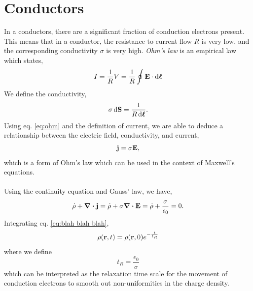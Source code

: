 \documentclass{book}
\begin{document}
\section{Conductors}
In a conductors, there are a significant fraction of conduction electrons present. This means that in a conductor, the resistance to current flow $R$ is very low, and the corresponding conductivity $\sigma$ is very high. \textit{Ohm's law} is an empirical law which states,
\begin{equation}
	I = \frac{1}{R}V = \frac{1}{R}\oint\vb{E}\cdot\dd{\vb*{\ell}} \label{eq:ohm}
\end{equation}
We define the conductivity,
\begin{equation}
	\sigma \dd{\vb{S}} = \frac{1}{R\dd{\vb*{\ell}}}.
\end{equation}
Using eq. \eqref{eq:ohm} and the definition of current, we are able to deduce a relationship between the electric field, conductivity, and current,
\begin{equation}
	\vb{j} = \sigma \vb{E},
\end{equation}
which is a form of Ohm's law which can be used in the context of Maxwell's equations.
\\\\
Using the continuity equation and Gauss' law, we have,
\begin{equation}
	\Dot{\rho} + \div{\vb{j}} = \Dot{\rho} + \sigma\div{\vb{E}} = \Dot{\rho} + \frac{\sigma}{\epsilon_0} = 0. \label{eq:blah blah blah}
\end{equation}
Integrating eq. \eqref{eq:blah blah blah}, 
\begin{equation}
	\rho(\vb{r},t) = \rho(\vb{r}, 0)e^{-\frac{t}{t_R}}
\end{equation}
where we define
\begin{equation}
	t_R = \frac{\epsilon_0}{\sigma}
\end{equation}
which can be interpreted as the relaxation time scale for the movement of conduction electrons to smooth out non-uniformities in the charge density.
\end{document}
